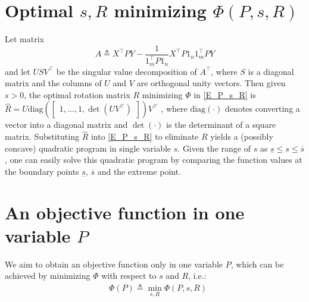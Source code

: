 \documentclass[11pt,bezier,]{article}
\begin{document}
\section{Optimal $s,R$ minimizing $\Phi(P,s,R)$ \label{optimal_s_R}}
Let matrix
\[
 A\triangleq   
  X^\top P Y - \frac{1}{1_m^\top P1_n} X^\top P 1_n 1_m^\top PY 
\]
and let $USV^\top$ be the singular value decomposition of $A^\top$,
where $S$ is a diagonal matrix and
the columns of  $U$ and $V$ are orthogonal unity vectors.
Then given $s> 0$, 
the optimal rotation matrix  $R$ minimizing $\Phi$ in   \eqref{E_P_s_R} is
$\widehat R=U\text{diag}(\begin{bmatrix}
                     1,\ldots,1,\det(UV^\top)
                    \end{bmatrix})V^\top$ \cite{CPD},
where $\text{diag}(\cdot)$ denotes converting a vector into a diagonal matrix
and $\det(\cdot)$ is the determinant of a square matrix.
Substituting $\widehat R$  into \eqref{E_P_s_R} to eliminate $R$ 
yields  a (possibly concave) quadratic program in single variable $s$.
Given the range of $s$ as $\underline{s}\le s \le \overline{s}$,
one can easily solve  this  quadratic program 
by comparing the function values at the boundary points $\underline{s}$, $\overline{s}$ and 
the extreme  point.

\section{An objective function in one variable $P$
\label{sec:regularize}}


We aim to obtain an objective function only in one variable $P$,
which can be achieved by minimizing $\Phi$ with respect to $s$ and $R$, i.e.:
\begin{align}
& \Phi(P)\triangleq\min_{s,R}  \Phi(P,s,R) 
\label{E_P}
\end{align}

  
\end{document}

